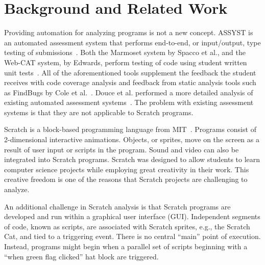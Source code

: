 \section{Background and Related Work}

Providing automation for analyzing programs is not a new concept.  ASSYST is an
automated assessment system that performs end-to-end, or input/output, type
testing of submissions~\cite{Jackson:1997:GSP:268084.268210}. Both the Marmoset
system by Spacco et al., and the Web-CAT system, by Edwards, perform testing of
code using student written unit tests~\cite{Spacco:2006:EMD:1140124.1140131,
  Edwards:2003:RCS:949344.949390}. All of the aforementioned tools supplement
the feedback the student receives with code coverage analysis and feedback from
static analysis tools such as FindBugs by Cole et
al.~\cite{Cole:2006:IYS:1176617.1176667}. Douce et al. performed a more
detailed analysis of existing automated assessment
systems~\cite{Douce:2005:ATA:1163405.1163409}.  The problem with existing
assessment systems is that they are not applicable to Scratch programs.

Scratch is a block-based programming language from
MIT~\cite{Maloney:2010:SPL:1868358.1868363}.  Programs consist of 2-dimensional
interactive animations.  Objects, or sprites, move on the screen as a result of
user input or scripts in the program.  Sound and video can also be integrated
into Scratch programs.  Scratch was designed to allow students to learn
computer science projects while employing great creativity in their work.  This
creative freedom is one of the reasons that Scratch projects are challenging to
analyze.

An additional challenge in Scratch analysis is that Scratch programs are
developed and run within a graphical user interface (GUI).  Independent
segments of code, known as scripts, are associated with Scratch sprites, e.g.,
the Scratch Cat, and tied to a triggering event.  There is no central ``main''
point of execution.  Instead, programs might begin when a parallel set of
scripts beginning with a ``when green flag clicked'' hat block are triggered.

